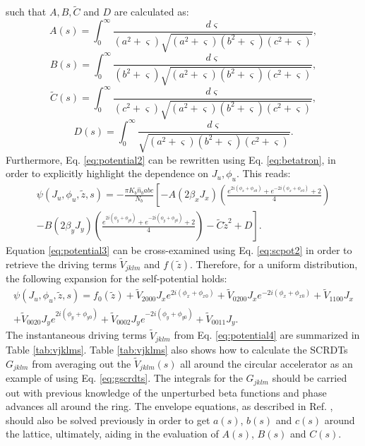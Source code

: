 such that $A,B,\tilde{C}$ and $D$ are calculated as:
\begin{equation}
    \label{eq:A}
    A(s)=\int_0^{\infty}{\frac{d \varsigma }{\left( a^2+ \varsigma \right) \sqrt{\left( a^2+ \varsigma \right) \left( b^2+ \varsigma \right) \left( c^2+ \varsigma \right)}}},
\end{equation}
\begin{equation}
    \label{eq:B}
    B(s)=\int_0^{\infty}{\frac{d \varsigma }{\left( b^2+ \varsigma \right) \sqrt{\left( a^2+ \varsigma \right)\left( b^2+ \varsigma \right)\left( c^2+ \varsigma \right)}}},
\end{equation}
\begin{equation}
    \label{eq:C}
    \tilde{C}(s)=\int_0^{\infty}{\frac{d \varsigma }{\left( c^2+ \varsigma \right) \sqrt{\left( a^2+ \varsigma \right) \left( b^2+ \varsigma \right) \left( c^2+ \varsigma \right)}}},
\end{equation}
\begin{equation}
    \label{eq:D}
    D(s)=\int_0^{\infty}{\frac{d \varsigma }{\sqrt{\left( a^2+ \varsigma \right) \left( b^2+ \varsigma \right) \left( c^2+ \varsigma \right)}}}.
\end{equation}
Furthermore, Eq. \ref{eq:potential2} can be rewritten using Eq. \ref{eq:betatron}, in order to explicitly highlight the dependence on $J_u,\phi_u$. This reads:
\begin{multline}
    \label{eq:potential3}
    \psi(J_u,\phi_u, \tilde{z},s)=-\frac{\pi K_b \hat{n}_b a b c }{N_b} \left[ -A \left( 2 \beta_x J_x \right) \left( \frac{e^{2i(\phi_x+\phi_{x0})}+e^{-2i(\phi_x+\phi_{x0})}+2}{4} \right) \right. \\
    \left. -B \left( 2 \beta_y J_y \right) \left( \frac{e^{2i(\phi_y+\phi_{y0})}+e^{-2i(\phi_y+\phi_{y0})}+2}{4}\right) - \tilde{C} \tilde{z}^2 +D  \right].
\end{multline}
Equation \ref{eq:potential3} can be cross-examined using Eq. \ref{eq:scpot2} in order to retrieve the driving terms $\tilde{V}_{jklm}$ and $f(\tilde{z})$. Therefore, for a uniform distribution, the following expansion for the self-potential holds:
\begin{multline}
    \label{eq:potential4}
    \psi(J_u,\phi_u, \tilde{z},s) = f_0(\tilde{z})+\tilde{V}_{2000}J_x e^{2i(\phi_x+\phi_{x0})}+\tilde{V}_{0200}J_x e^{-2i(\phi_x+\phi_{x0})}+\tilde{V}_{1100}J_x\\+\tilde{V}_{0020}J_y e^{2i(\phi_y+\phi_{y0})}+\tilde{V}_{0002}J_y e^{-2i(\phi_y+\phi_{y0})}+\tilde{V}_{0011}J_y.
\end{multline}
The instantaneous driving terms $\tilde{V}_{jklm}$ from Eq. \ref{eq:potential4} are summarized in Table \ref{tab:vjklms}. Table \ref{tab:vjklms} also shows how to calculate the SCRDTs $G_{jklm}$ from averaging out the $\tilde{V}_{jklm}(s)$ all around the circular accelerator as an example of using Eq. \ref{eq:gscrdts}. The integrals for the $G_{jklm}$ should be carried out with previous knowledge of the unperturbed beta functions and phase advances all around the ring. The envelope equations, as described in Ref. \cite{witchcraft}, should also be solved previously in order to get $a(s)$, $b(s)$ and $c(s)$ around the lattice, ultimately, aiding in the evaluation of $A(s)$, $B(s)$ and $C(s)$.

